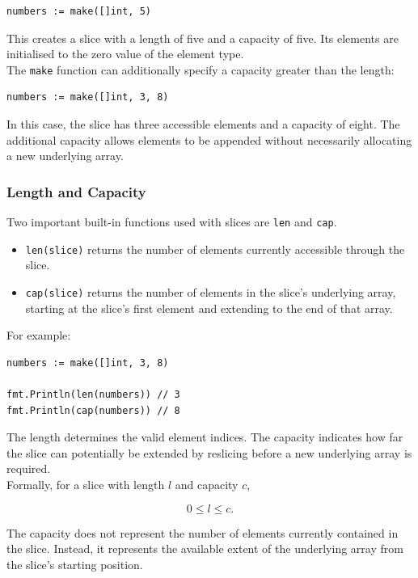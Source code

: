 \begin{lstlisting}
numbers := make([]int, 5)
\end{lstlisting}

This creates a slice with a length of five and a capacity of five. Its elements are initialised to the zero value of the element type.\\

The \texttt{make} function can additionally specify a capacity greater than the length:

\begin{lstlisting}
numbers := make([]int, 3, 8)
\end{lstlisting}

In this case, the slice has three accessible elements and a capacity of eight. The additional capacity allows elements to be appended without necessarily allocating a new underlying array.

\subsubsection{Length and Capacity}

Two important built-in functions used with slices are \texttt{len} and \texttt{cap}.

\begin{itemize}
    \item \texttt{len(slice)} returns the number of elements currently accessible through the slice.
    \item \texttt{cap(slice)} returns the number of elements in the slice's underlying array, starting at the slice's first element and extending to the end of that array.
\end{itemize}

For example:

\begin{lstlisting}
numbers := make([]int, 3, 8)

fmt.Println(len(numbers)) // 3
fmt.Println(cap(numbers)) // 8
\end{lstlisting}

The length determines the valid element indices. The capacity indicates how far the slice can potentially be extended by reslicing before a new underlying array is required.\\

Formally, for a slice with length \(l\) and capacity \(c\),

\[
0 \leq l \leq c.
\]

The capacity does not represent the number of elements currently contained in the slice. Instead, it represents the available extent of the underlying array from the slice's starting position.

